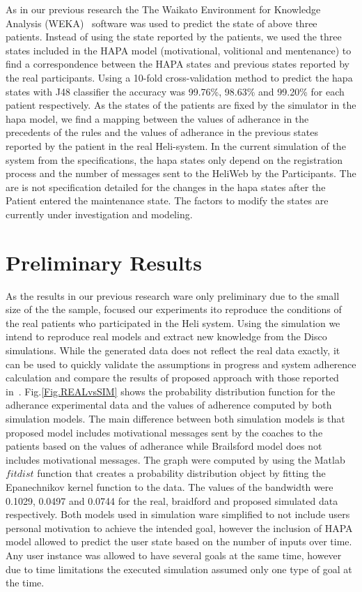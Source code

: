 \documentclass{llncs}
\begin{document}
As in our previous research the The Waikato Environment for Knowledge Analysis (WEKA)~\cite{WEKA} software was used to predict the state of above three patients. Instead of using the state reported by the patients, we used the three states included in the HAPA model (motivational, volitional and mentenance) to find a correspondence between the HAPA states and previous states reported by the real participants.  Using a 10-fold cross-validation method to predict the hapa states with J48 classifier the accuracy was  99.76\%, 98.63\% and 99.20\% for each patient respectively. As the states of the patients are fixed by the simulator in the hapa model, we find a mapping between the values of adherance in the precedents of the rules and the values of adherance in the previous states reported by the patient in the real Heli-system. In the current simulation of the system from the specifications, the hapa states only depend on the registration process and the number of messages sent to the HeliWeb by the Participants. The are is not specification detailed for the changes in the hapa states after the Patient entered the maintenance state. The factors to modify the states are currently under investigation and modeling.

\section {Preliminary Results}
\label{sec.results}

As the results in our previous research ware only preliminary due to the small size of the the sample, focused our experiments ito reproduce the conditions of the real patients who participated in the Heli system. Using the simulation we intend to reproduce real models and extract new knowledge from the Disco simulations.  While the generated data does not reflect the real data exactly, it can be used to quickly validate the assumptions in progress and system adherence calculation and compare the results of proposed approach with those reported in~\cite{Brailsford2016}. Fig.\ref{Fig.REALvsSIM} shows the probability distribution function for the adherance experimental data and the values of adherence computed by both simulation models. The main difference between both simulation models is that proposed model includes motivational messages sent by the coaches to the patients based on the values of adherance while Brailsford model does not includes motivational messages. The graph were computed by using the Matlab $fitdist$ function that creates a probability distribution object by fitting the Epanechnikov kernel function to the data. The values of the bandwidth were 0.1029, 0.0497 and 0.0744 for the real, braidford and proposed simulated data respectively. Both models used in simulation ware simplified to not include users personal motivation to achieve the intended goal, however the inclusion of HAPA model allowed to predict the user state based on the number of inputs over time. Any user instance was allowed to have several goals at the same time, however due to time limitations the executed simulation assumed only one type of goal at the time. 
\end{document}
